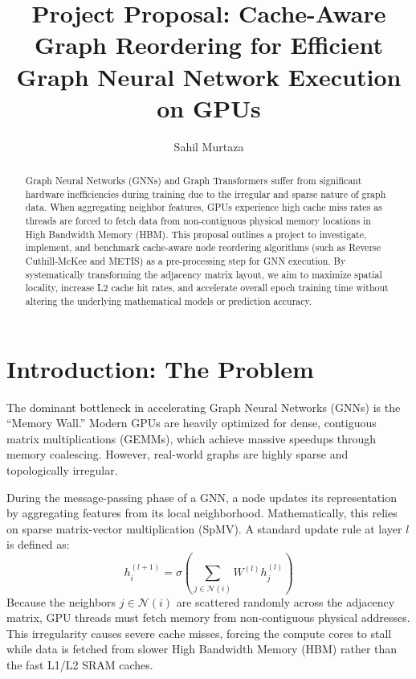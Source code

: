 \documentclass[sigconf,review]{acmart}
\begin{document}
\title{Project Proposal: Cache-Aware Graph Reordering for Efficient Graph Neural Network Execution on GPUs}

\author{Sahil Murtaza}

\begin{abstract}
Graph Neural Networks (GNNs) and Graph Transformers suffer from significant hardware inefficiencies during training due to the irregular and sparse nature of graph data. When aggregating neighbor features, GPUs experience high cache miss rates as threads are forced to fetch data from non-contiguous physical memory locations in High Bandwidth Memory (HBM). This proposal outlines a project to investigate, implement, and benchmark cache-aware node reordering algorithms (such as Reverse Cuthill-McKee and METIS) as a pre-processing step for GNN execution. By systematically transforming the adjacency matrix layout, we aim to maximize spatial locality, increase L2 cache hit rates, and accelerate overall epoch training time without altering the underlying mathematical models or prediction accuracy.
\end{abstract}


\maketitle

\section{Introduction: The Problem}
The dominant bottleneck in accelerating Graph Neural Networks (GNNs) is the ``Memory Wall.'' Modern GPUs are heavily optimized for dense, contiguous matrix multiplications (GEMMs), which achieve massive speedups through memory coalescing. However, real-world graphs are highly sparse and topologically irregular.

During the message-passing phase of a GNN, a node updates its representation by aggregating features from its local neighborhood. Mathematically, this relies on sparse matrix-vector multiplication (SpMV). A standard update rule at layer $l$ is defined as:
\begin{equation}
    h_i^{(l+1)} = \sigma \left( \sum_{j \in \mathcal{N}(i)} W^{(l)} h_j^{(l)} \right)
\end{equation}
Because the neighbors $j \in \mathcal{N}(i)$ are scattered randomly across the adjacency matrix, GPU threads must fetch memory from non-contiguous physical addresses. This irregularity causes severe cache misses, forcing the compute cores to stall while data is fetched from slower High Bandwidth Memory (HBM) rather than the fast L1/L2 SRAM caches.
\end{document}
